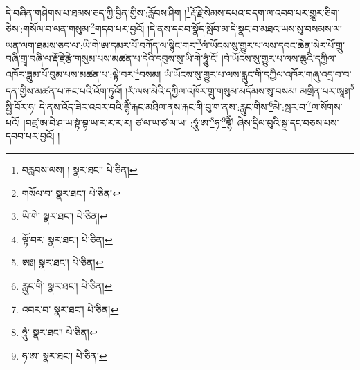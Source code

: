 དེ་བཞིན་གཤེགས་པ་ཐམས་ཅད་ཀྱི་བྱིན་གྱིས་:རློབས་ཤིག །\footnote{བརླབས་ལས། །  སྣར་ཐང་།  པེ་ཅིན། }རྡོ་རྗེ་སེམས་དཔའ་བདག་ལ་འབབ་པར་གྱུར་ཅིག་ཅེས་:གསོལ་བ་ལན་གསུམ་\footnote{གསོལ་བ་  སྣར་ཐང་།  པེ་ཅིན། }གདབ་པར་བྱའོ། །དེ་ནས་དབབ་སྣོད་སློབ་མ་དེ་སྣང་བ་མཐའ་ཡས་སུ་བསམས་ལ། ཡན་ལག་ཐམས་ཅད་ལ་:ཡི་གེ་ཨ་དམར་པོ་བཀོད་ལ་སྙིང་གར་\footnote{ཡི་གེ་  སྣར་ཐང་།  པེ་ཅིན། }ལཾ་ཡོངས་སུ་གྱུར་པ་ལས་དབང་ཆེན་སེར་པོ་གྲུ་བཞི་གྲྭ་བཞི་ལ་རྡོ་རྗེ་རྩེ་གསུམ་པས་མཚན་པ་དེའི་དབུས་སུ་ཡི་གེ་ཧཱུཾ་ངོ། །བཾ་ཡོངས་སུ་གྱུར་པ་ལས་ཆུའི་དཀྱིལ་འཁོར་ཟླུམ་པོ་བུམ་པས་མཚན་པ་:ལྟེ་བར་\footnote{ལྟོ་བར་  སྣར་ཐང་།  པེ་ཅིན། }བསམ། ཡཾ་ཡོངས་སུ་གྱུར་པ་ལས་རླུང་གི་དཀྱིལ་འཁོར་གཞུ་འདྲ་བ་བ་དན་གྱིས་མཚན་པ་རྐང་པའི་འོག་ཏུའོ། །རཾ་ལས་མེའི་དཀྱིལ་འཁོར་གྲུ་གསུམ་མདོམས་སུ་བསམ། མགྲིན་པར་ཨཱཿ།\footnote{ཨཿ།  སྣར་ཐང་།  པེ་ཅིན། } སྤྱི་བོར་ཧ། དེ་ནས་འོད་ཟེར་འབར་བའི་ཛྷཻཾ་རྐང་མཐིལ་ནས་རྐང་གི་བུ་ག་ནས་:རླུང་གིས་\footnote{རླུང་གི་  སྣར་ཐང་།  པེ་ཅིན། }མེ་:སྦར་བ་\footnote{འབར་བ་  སྣར་ཐང་།  པེ་ཅིན། }ལ་སོགས་པའོ། །བཛྲ་ཨ་བེ་ཤ་ཡ་སྟཾ་བྷ་ཡ་ར་ར་ར་ར། ཙ་ལ་ཡ་ཙ་ལ་ཡ། :ཧཱུཾ་ཨ་\footnote{ཧཱུཾ་  སྣར་ཐང་།  པེ་ཅིན། }ཧ་\footnote{ཧ་ཨ་  སྣར་ཐང་།  པེ་ཅིན། }ཛྷཻཾ། ཞེས་དྲིལ་བུའི་སྒྲ་དང་བཅས་པས་དབབ་པར་བྱའོ། །
